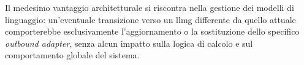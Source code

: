 Il medesimo vantaggio architetturale si riscontra nella gestione dei modelli di linguaggio: 
un'eventuale transizione verso un \gls{llmg} differente da quello attuale comporterebbe 
esclusivamente l'aggiornamento o la sostituzione dello specifico \textit{outbound adapter}, 
senza alcun impatto sulla logica di calcolo e sul comportamento globale del sistema.
